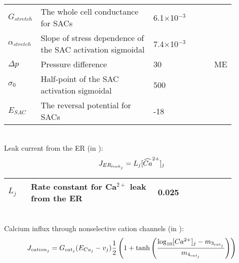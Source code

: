 \documentclass[fleqn]{report}
\numberwithin{equation}{section}
\numberwithin{equation}{section}
\begin{document}
							\begin{table}[h!]
							\centering
							\begin{tabular}{ p{0.09\linewidth}  >{\footnotesize} p{0.5\linewidth}  >{\footnotesize} p{0.27\linewidth} >{\footnotesize} p{0.03\linewidth} }
							\hline
							$G_{stretch}$      		& The whole cell conductance for SACs						& 6.1$\times$10$^{-3}$ \uMpmVs	&\cite{Koenigsberger2006} \\
							$\alpha_{stretch}$      & Slope of stress dependence of the SAC activation sigmoidal	& 7.4$\times$10$^{-3}$ \pmmHg	&\cite{Koenigsberger2006} \\
							$ \Delta p $			& Pressure difference										& 30 \mmHg			& ME \\
							$\sigma_{0}$      		& Half-point of the SAC activation sigmoidal				& 500 \mmHg			&\cite{Koenigsberger2006} \\
							$E_{SAC}$      			& The reversal potential for SACs							& -18 \mV			&\cite{Koenigsberger2006} \\
							\hline
							\end{tabular}
							\label{tab:Jstretchj}
							\end{table}
							\\
							Leak current from the ER (in \uMs):
							\begin{equation} \label{eq:JERleakj}
							J_{ER_{leak_{j}}} = L_{j}[\widehat{Ca}^{2+}]_{j}
							\end{equation}
							\begin{table}[h!]
							\centering
							\begin{tabular}{ p{0.09\linewidth}  >{\footnotesize} p{0.5\linewidth}  >{\footnotesize} p{0.27\linewidth} >{\footnotesize} p{0.03\linewidth} }
							\hline
							$L_{j}$      			& Rate constant for Ca$^{2+}$ leak from the ER 		 & 0.025	\pers			& \cite{Koenigsberger2006} \\
							\hline
							\end{tabular}
							\label{tab:JKj}
							\end{table}
							\\
							Calcium influx through nonselective cation channels (in \uMs):
							\begin{equation} \label{eq:Jcationj}
							J_{cation_{j}} = G_{cat_{j}} (E_{Ca_{j}} - v_{j}) \frac{1}{2} \left(   1+ \mathrm{tanh}  \left(  \frac{\mathrm{log}_{10} [Ca^{2+}]_{j} - m_{3_{cat_{j}}} }    {m_{4_{cat_{j}}}}   \right)      \right) 
							\end{equation}
\end{document}
